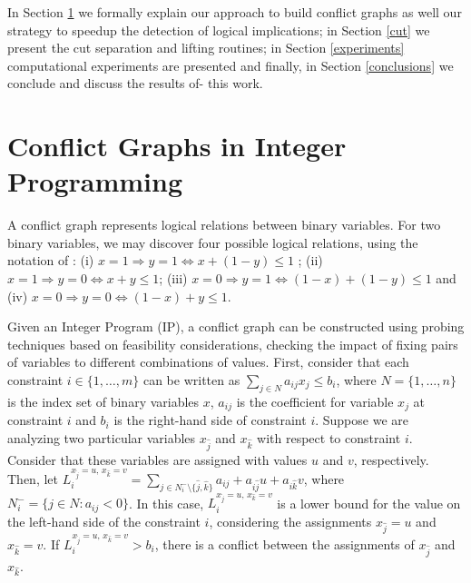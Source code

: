 \documentclass{endm}
\begin{document}
In Section \ref{seccgraph} we formally explain our approach to build conflict graphs as well our strategy to speedup the detection of logical implications; in Section \ref{cut} we present the cut separation and lifting routines; in Section \ref{experiments} computational experiments are presented and finally, in Section \ref{conclusions} we conclude and discuss the results of- this work.

\section{Conflict Graphs in Integer Programming}\label{seccgraph}

A conflict graph represents logical relations between binary variables. For two binary variables, we may discover four possible logical relations, using the notation of \cite{atamturk}: (i) $x = 1 \Rightarrow y = 1 \Longleftrightarrow x + (1 - y)  \leq 1$ ; (ii) $x=1 \Rightarrow y = 0 \Longleftrightarrow x + y \leq 1$; (iii) $x = 0 \Rightarrow y = 1 \Longleftrightarrow  (1 - x) + (1 - y) \leq 1$ and (iv) $x = 0 \Rightarrow y = 0 \Longleftrightarrow (1 - x) + y \leq 1$.

Given an Integer Program (IP), a conflict graph can be constructed using probing techniques based on feasibility considerations\cite{achterberg,atamturk}, checking the impact of fixing pairs of variables to different combinations of values. First, consider that each constraint $i \in \{1,\ldots,m\}$ can be written as $\displaystyle \sum_{j \in N} a_{ij}x_{j} \leq b_{i}$, where $N=\{1,\ldots,n\}$ is the index set of binary variables $x$, $a_{ij}$ is the coefficient for variable $x_{j}$ at constraint $i$ and $b_{i}$ is the right-hand side of constraint $i$. Suppose we are analyzing two particular variables $x_{\hat{j}}$ and $x_{\hat{k}}$ with respect to constraint $i$. Consider that these variables are assigned with values $u$ and $v$, respectively. Then, let $\displaystyle
L_{i}^{x_{\hat{j}} = u,\, x_{\hat{k}} = v}=\sum_{j\in N_{i}^{-} \setminus \{\hat{j}, \hat{k}\}}a_{ij}+a_{i\hat{j}}u+a_{i\hat{k}}v $, where $N_{i}^{-} = \{j \in N : a_{ij} < 0\}$. In this case, $L_{i}^{x_{\hat{j}} = u,\, x_{\hat{k}} = v}$ is a lower bound for the value on the left-hand side  of the constraint $i$, considering the assignments $x_{\hat{j}} = u$ and $x_{\hat{k}} = v$. If $L_{i}^{x_{\hat{j}} = u,\, x_{\hat{k}} = v} > b_{i}$, there is a conflict between the assignments of $x_{\hat{j}}$ and $x_{\hat{k}}$. 
\end{document}
